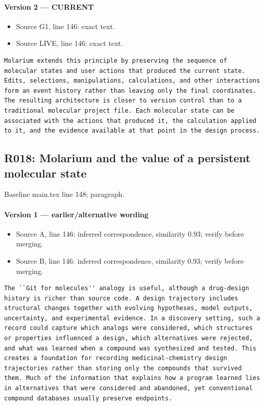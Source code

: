 \documentclass[11pt]{article}
\begin{document}
\paragraph{Version 2 --- CURRENT}

\begin{itemize}[leftmargin=*]
\item Source G1, line 146: exact text.
\item Source LIVE, line 146: exact text.
\end{itemize}

\begin{lstlisting}
Molarium extends this principle by preserving the sequence of molecular states and user actions that produced the current state. Edits, selections, manipulations, calculations, and other interactions form an event history rather than leaving only the final coordinates. The resulting architecture is closer to version control than to a traditional molecular project file. Each molecular state can be associated with the actions that produced it, the calculation applied to it, and the evidence available at that point in the design process.
\end{lstlisting}

\subsection{R018: Molarium and the value of a persistent molecular state}

Baseline main.tex line 148; paragraph.

\paragraph{Version 1 --- earlier/alternative wording}

\begin{itemize}[leftmargin=*]
\item Source A, line 146: inferred correspondence, similarity 0.93; verify before merging.
\item Source B, line 146: inferred correspondence, similarity 0.93; verify before merging.
\end{itemize}

\begin{lstlisting}
The ``Git for molecules'' analogy is useful, although a drug-design history is richer than source code. A design trajectory includes structural changes together with evolving hypotheses, model outputs, uncertainty, and experimental evidence. In a discovery setting, such a record could capture which analogs were considered, which structures or properties influenced a design, which alternatives were rejected, and what was learned when a compound was synthesized and tested. This creates a foundation for recording medicinal-chemistry design trajectories rather than storing only the compounds that survived them. Much of the information that explains how a program learned lies in alternatives that were considered and abandoned, yet conventional compound databases usually preserve endpoints.
\end{lstlisting}
\end{document}
